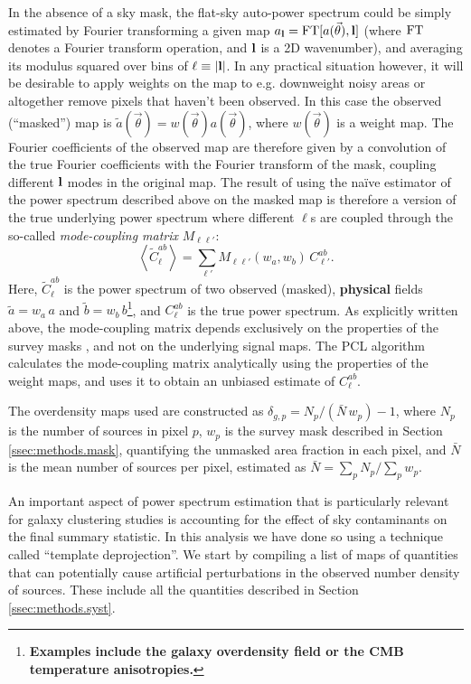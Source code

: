 \documentclass[a4paper,11pt]{article}
\newcommand{\nv}{\vec{\theta}}
\newcommand{\rev}[1]{{\textbf{#1}}}
\begin{document}
    In the absence of a sky mask, the flat-sky auto-power spectrum could be simply estimated by Fourier transforming a given map $a_{\bf l}={\rm FT}[a(\nv),{\bf l}]$ (where ${\rm FT}$ denotes a Fourier transform operation, and ${\bf l}$ is a 2D wavenumber), and averaging its modulus squared over bins of $\ell\equiv|{\bf l}|$. In any practical situation however, it will be desirable to apply weights on the map to e.g. downweight noisy areas or altogether remove pixels that haven't been observed. In this case the observed (``masked'') map is $\tilde{a}(\nv)=w(\nv)a(\nv)$, where $w(\nv)$ is a weight map. The Fourier coefficients of the observed map are therefore given by a convolution of the true Fourier coefficients with the Fourier transform of the mask, coupling different ${\bf l}$ modes in the original map. The result of using the na\"ive estimator of the power spectrum described above on the masked map is therefore a version of the true underlying power spectrum where different $\ell$s are coupled through the so-called {\sl mode-coupling matrix} $M_{\ell\ell'}$:
    \begin{equation}
      \left\langle \tilde{C}^{ab}_\ell \right\rangle = \sum_{\ell'} M_{\ell\ell'}(w_a,w_b)\,C^{ab}_{\ell'}.
    \end{equation}
    Here, $\tilde{C}^{ab}_\ell$ is the power spectrum of two observed (masked), \rev{physical} fields $\tilde{a}=w_a\,a$ and $\tilde{b}=w_b\,b$\footnote{\rev{Examples include the galaxy overdensity field or the CMB temperature anisotropies.}}, and $C^{ab}_\ell$ is the true power spectrum. As explicitly written above, the mode-coupling matrix depends exclusively on the properties of the survey masks \citep{2002ApJ...567....2H}, and not on the underlying signal maps. The PCL algorithm calculates the mode-coupling matrix analytically using the properties of the weight maps, and uses it to obtain an unbiased estimate of $C^{ab}_\ell$.
    
    The overdensity maps used are constructed as $\delta_{g,p}=N_p/(\bar{N}\,w_p)-1$, where $N_p$ is the number of sources in pixel $p$, $w_p$ is the survey mask described in Section \ref{ssec:methods.mask}, quantifying the unmasked area fraction in each pixel, and $\bar{N}$ is the mean number of sources per pixel, estimated as $\bar{N}=\sum_p N_p/\sum_p w_p$.
    
    An important aspect of power spectrum estimation that is particularly relevant for galaxy clustering studies is accounting for the effect of sky contaminants on the final summary statistic. In this analysis we have done so using a technique called ``template deprojection''. We start by compiling a list of maps of quantities that can potentially cause artificial perturbations in the observed number density of sources. These include all the quantities described in Section \ref{ssec:methods.syst}.
    
\end{document}

